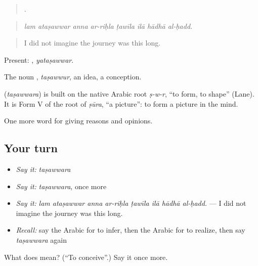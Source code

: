 \begin{quote}
       .
\end{quote}

\begin{quote}
\emph{lam ataṣawwar anna ar-riḥla ṭawīla ilā hādhā al-ḥadd.}
\end{quote}

\begin{quote}
I did not imagine the journey was this long.
\end{quote}

Present: , \emph{yataṣawwar}.

The noun , \emph{taṣawwur}, an idea, a conception.

\begin{cousinweb}
\textbf{} (\emph{taṣawwara}) is built on the native Arabic root \emph{ṣ-w-r}, \textquotedblleft{}to form, to shape\textquotedblright{} (Lane). It is Form V of the root of \emph{ṣūra}, \textquotedblleft{}a picture\textquotedblright{}: to form a picture in the mind.
\end{cousinweb}

\begin{grammarlens}[title={What you've built}]
One more word for giving reasons and opinions.
\end{grammarlens}

\subsection*{Your turn}
\begin{itemize}
\raggedright
  \item \emph{Say it:} \emph{taṣawwara}
  \item \emph{Say it:} \emph{taṣawwara}, once more
  \item \emph{Say it:} \emph{lam ataṣawwar anna ar-riḥla ṭawīla ilā hādhā al-ḥadd.} — I did not imagine the journey was this long.
  \item \emph{Recall:} say the Arabic for to infer, then the Arabic for to realize, then say \emph{taṣawwara} again
\end{itemize}

\begin{tcolorbox}[breakable,colback=teal!4,colframe=teal!35!black,title={Before you move on}]
What does  mean? (\textquotedblleft{}To conceive\textquotedblright{}.) Say it once more.
\end{tcolorbox}
